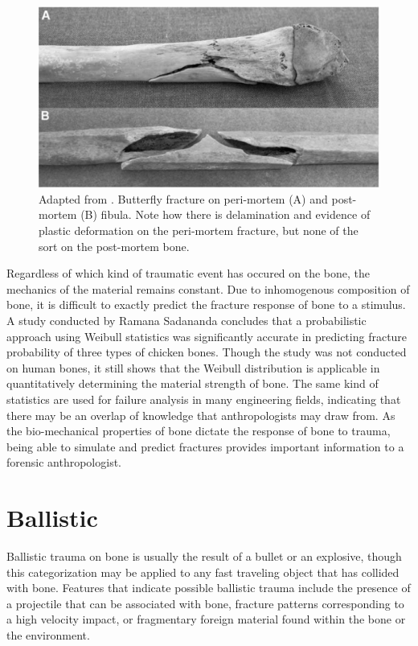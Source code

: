 \documentclass[titlepage]{article}
\begin{document}
\begin{figure}[h!]
\centering
\includegraphics[width=.7\linewidth]{fracture}
\caption{Adapted from \cite{blunt-trauma}. Butterfly fracture on peri-mortem (A) and post-mortem (B) fibula. Note how there is delamination and evidence of plastic deformation on the peri-mortem fracture, but none of the sort on the post-mortem bone.}
\label{fig:fracture}
\end{figure}

Regardless of which kind of traumatic event has occured on the bone, the mechanics of the material remains constant. Due to inhomogenous composition of bone, it is difficult to exactly predict the fracture response of bone to a stimulus. A study conducted by Ramana Sadananda concludes that a probabilistic approach using Weibull statistics was significantly accurate in predicting fracture probability of three types of chicken bones.\cite{fracture-analysis} Though the study was not conducted on human bones, it still shows that the Weibull distribution is applicable in quantitatively determining the material strength of bone. The same kind of statistics are used for failure analysis in many engineering fields, indicating that there may be an overlap of knowledge that anthropologists may draw from. As the bio-mechanical properties of bone dictate the response of bone to trauma, being able to simulate and predict fractures provides important information to a forensic anthropologist.

\section{Ballistic}
Ballistic trauma on bone is usually the result of a bullet or an explosive, though this categorization may be applied to any fast traveling object that has collided with bone. Features that indicate possible ballistic trauma include the presence of a projectile that can be associated with bone, fracture patterns corresponding to a high velocity impact, or fragmentary foreign material found within the bone or the environment.\cite{trauma}
\end{document}
